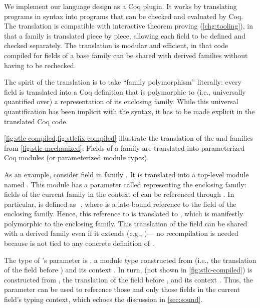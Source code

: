 We implement our language design as a Coq plugin.
%
It works by translating programs in \Lang syntax into
programs that can be checked and evaluated by Coq.
The translation is compatible with interactive theorem proving (\ref{chg:tooling}), in that
a family is translated piece by piece, allowing each field to be defined
and checked separately.
The translation is modular and efficient, in that
code compiled for fields of a base family
can be shared with derived families without having to be rechecked.


The spirit of the translation is to take ``family polymorphism''
literally: every field is translated into a Coq definition that is
polymorphic to (i.e., universally quantified over) a representation of
its enclosing family.
While this universal quantification has been implicit with the \Lang
syntax, it has to be made explicit in the translated Coq code.

\cref{fig:stlc-compiled,fig:stlcfix-compiled} illustrate the translation of the
 and  families from \cref{fig:stlc-mechanized}.
Fields of a family are translated into parameterized Coq modules
(or parameterized module types).

As an example,
consider field  in family .
It is translated into a top-level module named .
This module has a parameter called  representing the enclosing
family: fields of the current family in the context of  can be
referenced through .
In particular,  is defined as \,\lsti{->}\,,
where  is a late-bound reference to the  field of the
enclosing family.
Hence, this reference to  is translated to ,
which is manifestly polymorphic to the enclosing family.
This translation of the  field can be shared
with a derived family even if it extends  (e.g., )---%
no recompilation is needed because  is not tied to any
concrete definition of .

The type of 's  parameter is ,
a module type constructed from 
(i.e., the translation of the field before )
and its context .
In turn,  (not shown in \cref{fig:stlc-compiled}) is
constructed from ,
the translation of the field before ,
and its context .
Thus, the  parameter can be used to reference those and only
those fields in the current field's typing context, which echoes the
discussion in \cref{sec:sound}.

